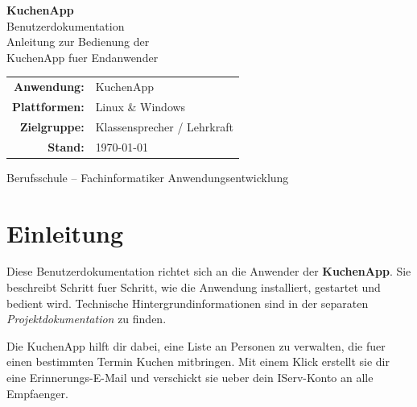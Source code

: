 \documentclass[12pt, a4paper]{article}
\begin{document}
\begin{titlepage}
\centering
{}

\vspace*{1cm}
{\color{white}\Huge\textbf{KuchenApp}}\\[0.4cm]
{\color{white!85}\LARGE Benutzerdokumentation}\\[4.5cm]

{\Large\color{primary} Anleitung zur Bedienung der\\[0.3cm]
KuchenApp fuer Endanwender}\\[2.5cm]

\begin{tcolorbox}[
    colback=codebg, colframe=codeborder,
    width=10cm, arc=4pt, boxrule=0.5pt,
    halign=center,
]
\begin{tabular}{rl}
    \textbf{Anwendung:} & KuchenApp \\
    \textbf{Plattformen:} & Linux \& Windows \\
    \textbf{Zielgruppe:} & Klassensprecher / Lehrkraft \\
    \textbf{Stand:} & \today \\
\end{tabular}
\end{tcolorbox}

\vfill
{\color{codegray}\small Berufsschule -- Fachinformatiker Anwendungsentwicklung}
\end{titlepage}

\tableofcontents
\newpage

\section{Einleitung}

Diese Benutzerdokumentation richtet sich an die Anwender der \textbf{KuchenApp}. Sie
beschreibt Schritt fuer Schritt, wie die Anwendung installiert, gestartet und
bedient wird. Technische Hintergrund\-informationen sind in der separaten
\emph{Projektdokumentation} zu finden.

\begin{infobox}
Die KuchenApp hilft dir dabei, eine Liste an Personen zu verwalten, die fuer einen
bestimmten Termin Kuchen mitbringen. Mit einem Klick erstellt sie dir eine
Erinnerungs-E-Mail und verschickt sie ueber dein IServ-Konto an alle Empfaenger.
\end{infobox}
\end{document}
